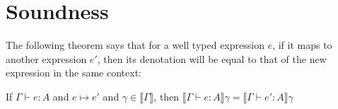 \section{Soundness}

The following theorem says that for a well typed expression $e$, if it maps to another expression $e'$, then its denotation will be equal to that of the new expression in the same context:

\vspace{0.35cm}

\begin{thm}
If $\Gamma \vdash e: A$ and $e \mapsto e'$ and $\gamma \in \llbracket \Gamma \rrbracket$, then $\llbracket \Gamma \vdash e : A \rrbracket \gamma =  \llbracket \Gamma \vdash e' : A \rrbracket \gamma$
\end{thm}

